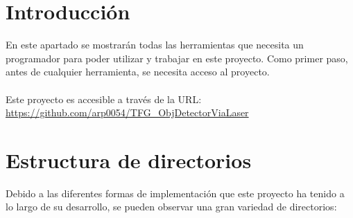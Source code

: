 
\section{Introducción}
En este apartado se mostrarán todas las herramientas que necesita un programador para poder utilizar y trabajar en este proyecto. Como primer paso, antes de cualquier herramienta, se necesita acceso al proyecto.\\
\\
Este proyecto es accesible a través de la URL: \url{https://github.com/arp0054/TFG_ObjDetectorViaLaser}\\

\section{Estructura de directorios}
Debido a las diferentes formas de implementación que este proyecto ha tenido a lo largo de su desarrollo, se pueden observar una gran variedad de directorios:
